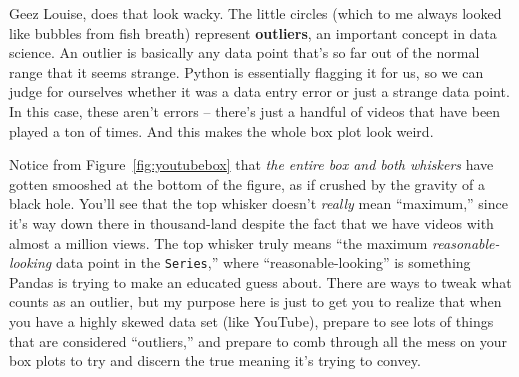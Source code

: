 
Geez Louise, does that look wacky. The little circles (which to me always
looked like bubbles from fish breath) represent \textbf{outliers}, an important
concept in data science. An outlier is basically any data point that's so far
out of the normal range that it seems strange. Python is essentially flagging
it for us, so we can judge for ourselves whether it was a data entry error or
just a strange data point. In this case, these aren't errors -- there's just a
handful of videos that have been played a ton of times. And this makes the
whole box plot look weird.


Notice from Figure~\ref{fig:youtubebox} that \textit{the entire box and both
whiskers} have gotten smooshed at the bottom of the figure, as if crushed by
the gravity of a black hole. You'll see that the top whisker doesn't
\textit{really} mean ``maximum,'' since it's way down there in thousand-land
despite the fact that we have videos with almost a million views. The top
whisker truly means ``the maximum \textit{reasonable-looking} data point in the
\texttt{Series},'' where ``reasonable-looking'' is something Pandas is trying
to make an educated guess about. There are ways to tweak what counts as an
outlier, but my purpose here is just to get you to realize that when you have a
highly skewed data set (like YouTube), prepare to see lots of things that are
considered ``outliers,'' and prepare to comb through all the mess on your box
plots to try and discern the true meaning it's trying to convey.

